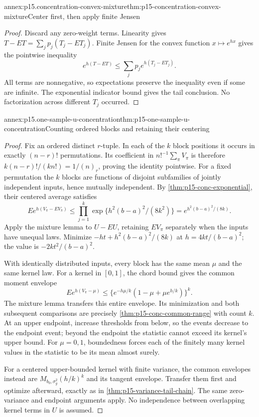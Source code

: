 \begin{annexitem}{annex:p15.concentration-convex-mixture}{thm:p15-concentration-convex-mixture}{Center first, then apply finite Jensen}
\begin{proof}
Discard any zero-weight terms.
Linearity gives \(T-ET=\sum_jp_j(T_j-ET_j)\).
Finite Jensen for the convex function \(x\mapsto e^{hx}\) gives
the pointwise inequality
\[
 e^{h(T-ET)}\leq\sum_jp_je^{h(T_j-ET_j)}.
\]
All terms are nonnegative, so expectations preserve the inequality
even if some are infinite. The exponential indicator bound gives the
tail conclusion. No factorization across different \(T_j\) occurred.
\end{proof}
\end{annexitem}

\begin{annexitem}{annex:p15.one-sample-u-concentration}{thm:p15-one-sample-u-concentration}{Counting ordered blocks and retaining their centering}
\begin{proof}
Fix an ordered distinct \(r\)-tuple. In each of the \(k\) block positions
it occurs in exactly \((n-r)!\) permutations.
Its coefficient in \(n!^{-1}\sum_\pi V_\pi\) is therefore
\(k(n-r)!/(kn!)=1/(n)_r\), proving the identity pointwise.
For a fixed permutation the \(k\) blocks are functions of disjoint
subfamilies of jointly independent inputs, hence mutually independent.
By \cref{thm:p15-conc-exponential}, their centered average satisfies
\[
 E e^{h(V_\pi-EV_\pi)}
 \leq\prod_{j=1}^k
       \exp\{h^2(b-a)^2/(8k^2)\}
 =e^{h^2(b-a)^2/(8k)}.
\]
Apply the mixture lemma to \(U-EU\), retaining \(EV_\pi\) separately
when the inputs have unequal laws. Minimize
\(-ht+h^2(b-a)^2/(8k)\) at \(h=4kt/(b-a)^2\); the value is
\(-2kt^2/(b-a)^2\).

With identically distributed inputs, every block has the same mean
\(\mu\) and the same kernel law. For a kernel in \([0,1]\), the chord
bound gives the common moment envelope
\[
 E e^{h(V_\pi-\mu)}
 \leq\{e^{-h\mu/k}(1-\mu+\mu e^{h/k})\}^{k}.
\]
The mixture lemma transfers this entire envelope. Its minimization
and both subsequent comparisons are precisely
\cref{thm:p15-conc-common-range} with count \(k\).
At an upper endpoint, increase thresholds from below, so the events
decrease to the endpoint event; beyond
the endpoint the statistic cannot exceed its kernel's upper bound.
For \(\mu=0,1\), boundedness forces each of the finitely many kernel
values in the statistic to be its mean almost surely.

For a centered upper-bounded kernel with finite variance, the common
envelopes instead are \(M_{b_0,\sigma_g^2}(h/k)^k\) and its tangent
envelope. Transfer them first and optimize afterward, exactly as in
\cref{thm:p15-variance-tail-chain}. The same zero-variance and
endpoint arguments apply. No independence between overlapping
kernel terms in \(U\) is assumed.
\end{proof}
\end{annexitem}

